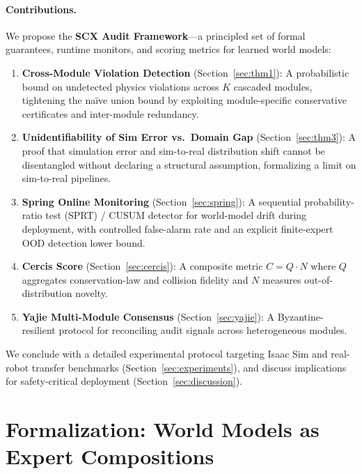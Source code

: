\documentclass[11pt,twocolumn]{article}
\theoremstyle{definition}
\begin{document}
\paragraph{Contributions.}
We propose the \textbf{SCX Audit Framework}---a principled set of formal
guarantees, runtime monitors, and scoring metrics for learned world models:

\begin{enumerate}[leftmargin=*,nosep]
  \item \textbf{Cross-Module Violation Detection} (Section~\ref{sec:thm1}):
    A probabilistic bound on undetected physics violations across $K$ cascaded
    modules, tightening the na\"ive union bound by exploiting module-specific
    conservative certificates and inter-module redundancy.
  \item \textbf{Unidentifiability of Sim Error vs.\ Domain Gap}
    (Section~\ref{sec:thm3}): A proof that simulation error and sim-to-real
    distribution shift cannot be disentangled without declaring a structural
    assumption, formalizing a limit on sim-to-real pipelines.
  \item \textbf{Spring Online Monitoring} (Section~\ref{sec:spring}): A
    sequential probability-ratio test (SPRT) / CUSUM detector for world-model
    drift during deployment, with controlled false-alarm rate and an explicit
    finite-expert OOD detection lower bound.
  \item \textbf{Cercis Score} (Section~\ref{sec:cercis}): A composite metric
    $C = Q \cdot N$ where $Q$ aggregates conservation-law and collision
    fidelity and $N$ measures out-of-distribution novelty.
  \item \textbf{Yajie Multi-Module Consensus} (Section~\ref{sec:yajie}): A
    Byzantine-resilient protocol for reconciling audit signals across
    heterogeneous modules.
\end{enumerate}

We conclude with a detailed experimental protocol targeting Isaac Sim and
real-robot transfer benchmarks (Section~\ref{sec:experiments}), and discuss
implications for safety-critical deployment (Section~\ref{sec:discussion}).

\section{Formalization: World Models as Expert Compositions}
\label{sec:formal}
\end{document}
